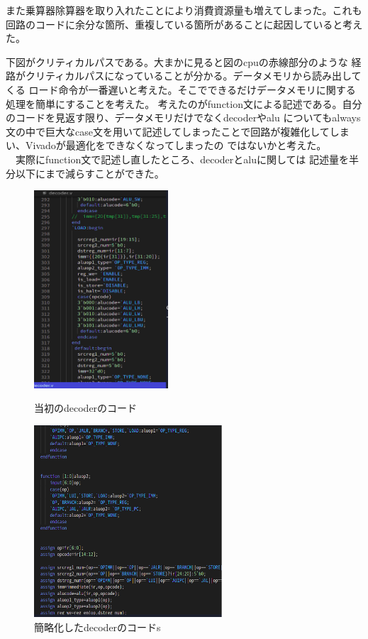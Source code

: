 \documentclass[12pt]{jreport}
\begin{document}
  また乗算器除算器を取り入れたことにより消費資源量も増えてしまった。これも
  回路のコードに余分な箇所、重複している箇所があることに起因していると考えた。

  下図がクリティカルパスである。大まかに見ると図のcpuの赤線部分のような
  経路がクリティカルパスになっていることが分かる。データメモリから読み出してくる
  ロード命令が一番遅いと考えた。そこでできるだけデータメモリに関する処理を簡単にすることを考えた。
  考えたのがfunction文による記述である。自分のコードを見返す限り、データメモリだけでなくdecoderやalu
  についてもalways文の中で巨大なcase文を用いて記述してしまったことで回路が複雑化してしまい、Vivadoが最適化をできなくなってしまったの
  ではないかと考えた。\\
  　実際にfunction文で記述し直したところ、decoderとaluに関しては
  記述量を半分以下にまで減らすことができた。\\
  \begin{figure}
    \centering
    \includegraphics[width=5cm]{picture/deco.png}
    \caption{当初のdecoderのコード}
    \includegraphics[width=7cm]{picture/deco2.png}
    \caption{簡略化したdecoderのコードs}
  \end{figure}
  
\end{document}

